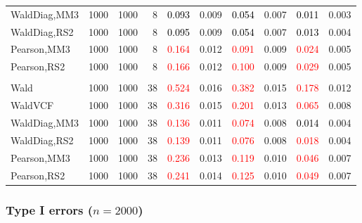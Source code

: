 \documentclass[
]{article}
\begin{document}
\begin{table}[H]
{\begin{tabular}[t]{lrrrrrrlrr}
\hspace{1em}WaldDiag,MM3 & 1000 & 1000 & 8 & \textcolor{black}{0.093} & 0.009 & \textcolor{black}{0.054} & 0.007 & \textcolor{black}{0.011} & 0.003\\
\hspace{1em}WaldDiag,RS2 & 1000 & 1000 & 8 & \textcolor{black}{0.095} & 0.009 & \textcolor{black}{0.054} & 0.007 & \textcolor{black}{0.013} & 0.004\\
\hspace{1em}Pearson,MM3 & 1000 & 1000 & 8 & \textcolor{red}{0.164} & 0.012 & \textcolor{red}{0.091} & 0.009 & \textcolor{red}{0.024} & 0.005\\
\hspace{1em}Pearson,RS2 & 1000 & 1000 & 8 & \textcolor{red}{0.166} & 0.012 & \textcolor{red}{0.100} & 0.009 & \textcolor{red}{0.029} & 0.005\\
\addlinespace[0.3em]
\multicolumn{10}{l}{\textbf{3F 15V}}\\
\hspace{1em}Wald & 1000 & 1000 & 38 & \textcolor{red}{0.524} & 0.016 & \textcolor{red}{0.382} & 0.015 & \textcolor{red}{0.178} & 0.012\\
\hspace{1em}WaldVCF & 1000 & 1000 & 38 & \textcolor{red}{0.316} & 0.015 & \textcolor{red}{0.201} & 0.013 & \textcolor{red}{0.065} & 0.008\\
\hspace{1em}WaldDiag,MM3 & 1000 & 1000 & 38 & \textcolor{red}{0.136} & 0.011 & \textcolor{red}{0.074} & 0.008 & \textcolor{black}{0.014} & 0.004\\
\hspace{1em}WaldDiag,RS2 & 1000 & 1000 & 38 & \textcolor{red}{0.139} & 0.011 & \textcolor{red}{0.076} & 0.008 & \textcolor{red}{0.018} & 0.004\\
\hspace{1em}Pearson,MM3 & 1000 & 1000 & 38 & \textcolor{red}{0.236} & 0.013 & \textcolor{red}{0.119} & 0.010 & \textcolor{red}{0.046} & 0.007\\
\hspace{1em}Pearson,RS2 & 1000 & 1000 & 38 & \textcolor{red}{0.241} & 0.014 & \textcolor{red}{0.125} & 0.010 & \textcolor{red}{0.049} & 0.007\\
\bottomrule
\end{tabular}}
\endgroup{}
\end{table}

\hypertarget{type-i-errors-n2000-1}{%
\subsubsection{\texorpdfstring{Type I errors
(\(n=2000\))}{Type I errors (n=2000)}}\label{type-i-errors-n2000-1}}
\end{document}
